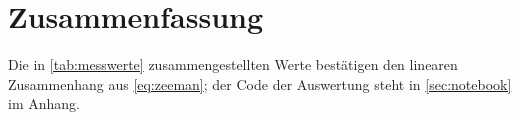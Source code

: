 \section{Zusammenfassung}

\blindtext

Die in \cref{tab:messwerte} zusammengestellten Werte bestätigen den
linearen Zusammenhang aus \cref{eq:zeeman}; der Code der Auswertung
steht in \cref{sec:notebook} im Anhang.
